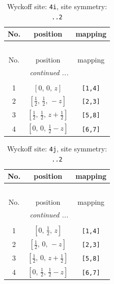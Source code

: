 \documentclass[fleqn,8pt]{jsarticle}
\begin{document}
\renewcommand{\arraystretch}{1.2}
\begin{longtable}{ccc}
\caption{Wyckoff site: {\tt 4i}, site symmetry: {\tt ..2}}
 \\
 \hline \hline
No. & position & mapping \\ \hline \endfirsthead

\multicolumn{2}{l}{\tablename\ \thetable{}} \\
 \hline \hline
No. & position & mapping \\ \hline \endhead

 \hline \hline
\multicolumn{2}{r}{\footnotesize\it continued ...} \\ \endfoot

 \hline \hline
\multicolumn{2}{r}{} \\ \endlastfoot

1 & $\left[ 0,\, 0,\, z \right]$ & {\tt [1,4]} \\ \hline
2 & $\left[ \frac{1}{2},\, \frac{1}{2},\, - z \right]$ & {\tt [2,3]} \\ \hline
3 & $\left[ \frac{1}{2},\, \frac{1}{2},\, z + \frac{1}{2} \right]$ & {\tt [5,8]} \\ \hline
4 & $\left[ 0,\, 0,\, \frac{1}{2} - z \right]$ & {\tt [6,7]} \\
\end{longtable}
\renewcommand{\arraystretch}{1.2}
\begin{longtable}{ccc}
\caption{Wyckoff site: {\tt 4j}, site symmetry: {\tt ..2}}
 \\
 \hline \hline
No. & position & mapping \\ \hline \endfirsthead

\multicolumn{2}{l}{\tablename\ \thetable{}} \\
 \hline \hline
No. & position & mapping \\ \hline \endhead

 \hline \hline
\multicolumn{2}{r}{\footnotesize\it continued ...} \\ \endfoot

 \hline \hline
\multicolumn{2}{r}{} \\ \endlastfoot

1 & $\left[ 0,\, \frac{1}{2},\, z \right]$ & {\tt [1,4]} \\ \hline
2 & $\left[ \frac{1}{2},\, 0,\, - z \right]$ & {\tt [2,3]} \\ \hline
3 & $\left[ \frac{1}{2},\, 0,\, z + \frac{1}{2} \right]$ & {\tt [5,8]} \\ \hline
4 & $\left[ 0,\, \frac{1}{2},\, \frac{1}{2} - z \right]$ & {\tt [6,7]} \\
\end{longtable}
\end{document}
